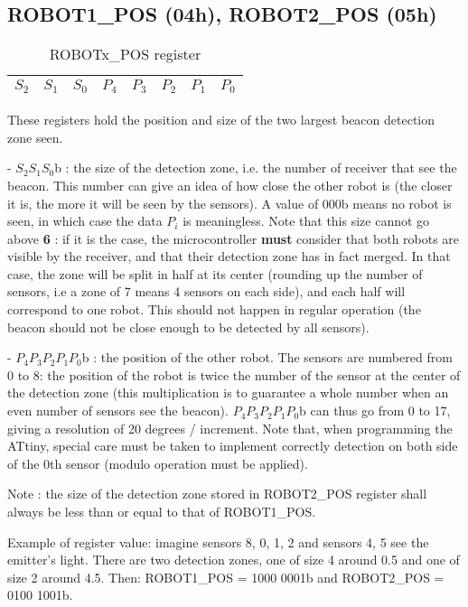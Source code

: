 \documentclass[a4paper,11pt]{article}
\begin{document}
\subsection{ROBOT1\_POS (04h), ROBOT2\_POS (05h)}

\begin{table}[H]
\centering
\caption{ROBOTx\_POS register}
\begin{tabularx}{\textwidth}{|Y|Y|Y|Y|Y|Y|Y|Y|}
\hline
\centering $S_2$ & $S_1$ & $S_0$ & $P_4$ & $P_3$ & $P_2$ & $P_1$ & $P_0$ \\ \hline  
\end{tabularx}
\end{table}

\par These registers hold the position and size of the two largest beacon detection zone seen.
\par - $S_2 S_1 S_0$b : the size of the detection zone, i.e. the number of receiver that see the beacon. This number can give an idea of how close the other robot is (the closer it is, the more it will be seen by the sensors). A value of 000b means no robot is seen, in which case the data $P_i$ is meaningless. Note that this size cannot go above \textbf{6} : if it is the case, the microcontroller \textbf{must} consider that both robots are visible by the receiver, and that their detection zone has in fact merged. In that case, the zone will be split in half at its center (rounding up the number of sensors, i.e a zone of 7 means 4 sensors on each side), and each half will correspond to one robot. This should not happen in regular operation (the beacon should not be close enough to be detected by all sensors).
\par - $P_4 P_3 P_2 P_1 P_0$b : the position of the other robot. The sensors are numbered from 0 to 8: the position of the robot is twice the number of the sensor at the center of the detection zone (this multiplication is to guarantee a whole number when an even number of sensors see the beacon). $P_4 P_3 P_2 P_1 P_0$b can thus go from 0 to 17, giving a resolution of 20 degrees / increment. Note that, when programming the ATtiny, special care must be taken to implement correctly detection on both side of the 0th sensor (modulo operation must be applied).
\par Note : the size of the detection zone stored in ROBOT2\_POS register shall always be less than or equal to that of ROBOT1\_POS.
\bigskip
\par Example of register value: imagine sensors 8, 0, 1, 2 and sensors 4, 5 see the emitter's light. There are two detection zones, one of size 4 around 0.5 and one of size 2 around 4.5. Then: ROBOT1\_POS = 1000 0001b and ROBOT2\_POS = 0100 1001b.
\end{document}
